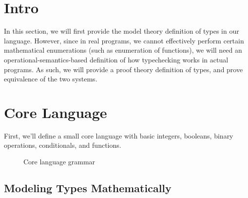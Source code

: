 \section{Intro}

In this section, we will first provide the model theory definition of types in 
our language. However, since in real programs, we cannot effectively perform 
certain mathematical enumerations (such as enumeration of functions), we will 
need an operational-semantics-based definition of how typechecking works in actual 
programs. As such, we will provide a proof theory definition of types, and prove
equivalence of the two systems.

\section{Core Language}

First, we'll define a small core language with basic integers, booleans, binary 
operations, conditionals, and functions.

\begin{figure}[hbt!]%
  \begin{grammar}
            \grule[types]{\syntype}{
              \tint
              \gor \tbool
              \gor \tfun
          }
        \end{grammar}
    \caption{Core language grammar}
    \label{fig_Grammar}
\end{figure}

\subsection{Modeling Types Mathematically}

